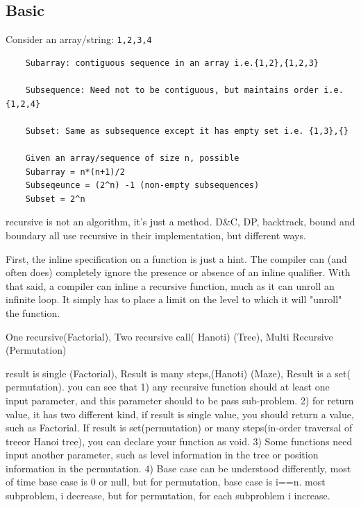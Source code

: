\documentclass[a4paper,11pt,twoside]{book}
\begin{document}
\subsection{Basic}

\par Consider an array/string: \texttt{{1,2,3,4}}
\begin{lstlisting}
	Subarray: contiguous sequence in an array i.e.{1,2},{1,2,3}
	
	Subsequence: Need not to be contiguous, but maintains order i.e. {1,2,4}
	
	Subset: Same as subsequence except it has empty set i.e. {1,3},{}
	
	Given an array/sequence of size n, possible
	Subarray = n*(n+1)/2
	Subseqeunce = (2^n) -1 (non-empty subsequences)
	Subset = 2^n
\end{lstlisting}


\par recursive is not an algorithm, it's just a method. D\&C, DP, backtrack, bound and boundary all use recursive in their implementation, but different ways. 

\par First, the inline specification on a function is just a hint. The compiler can (and often does) completely ignore the presence or absence of an inline qualifier. With that said, a compiler can inline a recursive function, much as it can unroll an infinite loop. It simply has to place a limit on the level to which it will "unroll" the function.

\par One recursive(Factorial),  Two recursive call( Hanoti) (Tree), Multi Recursive (Permutation)

\par result is single (Factorial), Result is many steps,(Hanoti) (Maze), Result is a set( permutation). you can see that 1) any recursive function should at least one input parameter, and this parameter should to be pass sub-problem. 2) for return value, it has two different kind, if result is single value, you should return a value, such as Factorial. If result is set(permutation) or many steps(in-order traversal of treeor Hanoi tree), you can declare your function as void. 3) Some functions need input another parameter, such as level information in the tree or position information in the permutation. 4) Base case can be understood differently, most of time base case is 0 or null, but for permutation, base case is i==n.  most subproblem, i decrease, but for permutation, for each subproblem i increase. 
\end{document}
